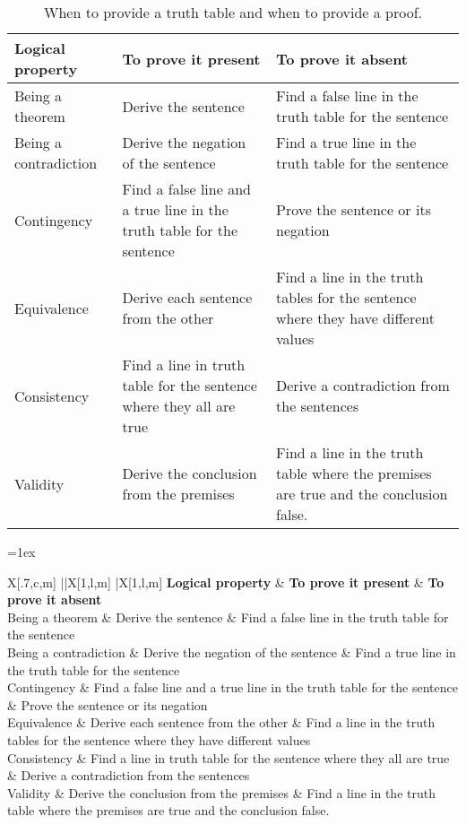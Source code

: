 \def\tmptable{\textbf{Logical property} 	&	\textbf{To prove it present} 	&	\textbf{To prove it absent} \\ \hline \hline
Being a theorem 		& Derive the sentence  						& Find a false line in the truth table for the sentence \\ \hline
Being a contradiction 	&  Derive the negation of the sentence  		 & Find a true line in the truth table for the sentence\\ \hline
Contingency 			& Find a false line and a true line in the truth table for the sentence & Prove the sentence or its negation\\ \hline
Equivalence 			& Derive each sentence from the other 		 & Find a line in the truth tables for the sentence where they have different values\\ \hline
Consistency 		& Find a line in truth table for the sentence where they all are true & Derive a contradiction from the sentences\\ \hline
Validity 				& Derive the conclusion from the premises & Find a line in the truth table where the premises are true and the conclusion false. \\ }

\iflatexml
\begin{table}
\begin{tabularx}{\textwidth}{X||X|X}
\tmptable
\end{tabularx}
\caption{When to provide a truth table and when to provide a proof.}
\label{table.ProofOrModel}
\end{table}
\else
\begin{table}\small
\tabulinesep=1ex
\begin{tabu}{X[.7,c,m] ||X[1,l,m] |X[1,l,m]}
\tmptable
\end{tabu}
\caption{When to provide a truth table and when to provide a proof.}
\label{table.ProofOrModel}
\end{table}
\fi



